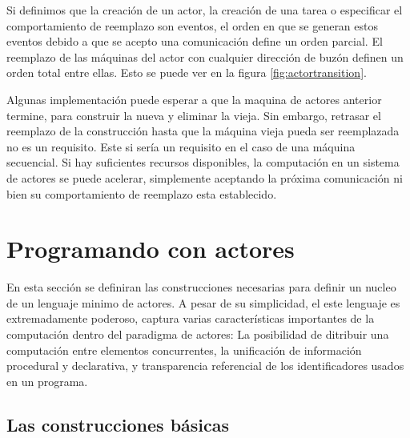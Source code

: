 Si definimos que la creación de un actor, la creación de una tarea o especificar el comportamiento de reemplazo son eventos, el orden en que se generan estos eventos debido a que se acepto una comunicación define un orden parcial. El reemplazo de las máquinas del actor con cualquier dirección de buzón definen un orden total entre ellas. Esto se puede ver en la figura \ref{fig:actortransition}.

Algunas implementación puede esperar a que la maquina de actores anterior termine, para construir la nueva y eliminar la vieja. Sin embargo, retrasar el reemplazo de la construcción hasta que la máquina vieja pueda ser reemplazada no es un requisito. Este si sería un requisito en el caso de una máquina secuencial. Si hay suficientes recursos disponibles, la computación en un sistema de actores se puede acelerar, simplemente aceptando la próxima comunicación ni bien su comportamiento de reemplazo esta establecido.

% 
% 
% 
% 
% 
% 


\section{Programando con actores}

En esta sección se definiran las construcciones necesarias para definir un nucleo de un lenguaje minimo de actores. A pesar de su simplicidad, el este lenguaje es extremadamente poderoso, captura varias características importantes de la computación dentro del paradigma de actores: La posibilidad de ditribuir una computación entre elementos concurrentes, la unificación de información procedural y declarativa, y transparencia referencial de los identificadores usados en un programa.

\subsection{Las construcciones básicas}

